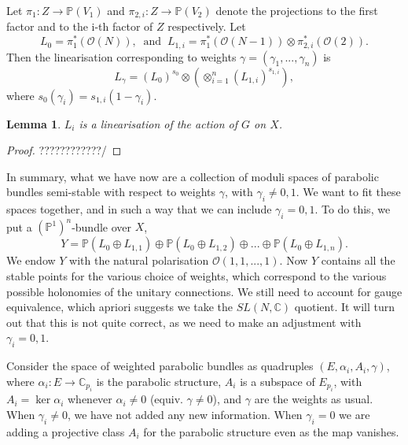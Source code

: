 \documentclass[]{article}
\newtheorem{lemma}{Lemma}
\newcommand{\C}{\mathbb{C}}
\newcommand{\OO}{\mathcal{O}}
\newcommand{\PP}{\mathbb{P}}
\begin{document}
	
Let $\pi_1:Z \to \PP(V_1)$ and $\pi_{2,i}:Z\to \PP(V_2)$ denote the projections to the first factor and to the i-th factor of $Z$ respectively. Let
\begin{equation}
	L_0 = \pi_1^\ast(\OO(N)),~ \text{ and } ~ L_{1,i} = \pi_1^\ast(\OO(N-1))\otimes \pi_{2,i}^\ast (\OO(2)).
\end{equation}
Then the linearisation corresponding to weights $\gamma = (\gamma_1,...,\gamma_n)$ is 
\begin{equation}
	L_\gamma = (L_0)^{s_0} \otimes \left(
	\otimes_{i=1}^n (L_{1,i})^{s_{1,i}}
	\right),
\end{equation}
where $s_0(\gamma_i) = s_{1,i}(1-\gamma_i)$.
\begin{lemma}
	$L_i$ is a linearisation of the action of $G$ on $X$.
\end{lemma}
\begin{proof}
	????????????/
\end{proof}
In summary, what we have now are a collection of moduli spaces of parabolic bundles semi-stable with respect to weights $\gamma$, with $\gamma_i \neq 0,1$. We want to fit these spaces together, and in such a way that we can include $\gamma_i = 0,1$. To do this, we put a $(\PP^1)^n$-bundle over $X$,
\begin{equation}
	Y = \PP(L_0\oplus L_{1,1})\oplus \PP(L_0\oplus L_{1,2})\oplus ... \oplus \PP(L_0\oplus L_{1,n}).
\end{equation}
We endow $Y$ with the natural polarisation $\OO(1,1,...,1)$. Now $Y$ contains all the stable points for the various choice of weights, which correspond to the various possible holonomies of the unitary connections. We still need to account for gauge equivalence, which apriori suggests we take the $SL(N,\C)$ quotient. It will turn out that this is not quite correct, as we need to make an adjustment with $\gamma_i = 0,1$.

Consider the space of weighted parabolic bundles as quadruples $(E, \alpha_i, A_i, \gamma)$, where $\alpha_i:E\to \C_{p_i}$ is the parabolic structure, $A_i$ is a subspace of $E_{p_i}$, with $A_i = \ker\alpha_i$ whenever $\alpha_i \neq 0$ (equiv. $\gamma \neq 0$), and $\gamma$ are the weights as usual. When $\gamma_i \neq 0$, we have not added any new information. When $\gamma_i = 0$ we are adding a projective class $A_i$ for the parabolic structure even as the map vanishes.
\end{document}
